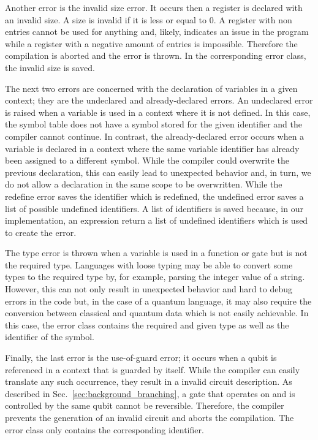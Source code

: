 Another error is the invalid size error. It occurs then a register is declared with an invalid size. A size is invalid if it is less or equal to $0$. A register with non entries cannot be used for anything and, likely, indicates an issue in the program while a register with a negative amount of entries is impossible. Therefore the compilation is aborted and the error is thrown. In the corresponding error class, the invalid size is saved.

The next two errors are concerned with the declaration of variables in a given context; they are the undeclared and already-declared errors. An undeclared error is raised when a variable is used in a context where it is not defined. In this case, the symbol table does not have a symbol stored for the given identifier and the compiler cannot continue. In contrast, the already-declared error occurs when a variable is declared in a context where the same variable identifier has already been assigned to a different symbol. While the compiler could overwrite the previous declaration, this can easily lead to unexpected behavior and, in turn, we do not allow a declaration in the same scope to be overwritten. While the redefine error saves the identifier which is redefined, the undefined error saves a list of possible undefined identifiers. A list of identifiers is saved because, in our implementation, an expression return a list of undefined identifiers which is used to create the error.

The type error is thrown when a variable is used in a function or gate but is not the required type. Languages with loose typing may be able to convert some types to the required type by, for example, parsing the integer value of a string. However, this can not only result in unexpected behavior and hard to debug errors in the code but, in the case of a quantum language, it may also require the conversion between classical and quantum data which is not easily achievable. In this case, the error class contains the required and given type as well as the identifier of the symbol.

Finally, the last error is the use-of-guard error; it occurs when a qubit is referenced in a context that is guarded by itself. While the compiler can easily translate any such occurrence, they result in a invalid circuit description. As described in Sec.~\ref{sec:background_branching}, a gate that operates on and is controlled by the same qubit cannot be reversible. Therefore, the compiler prevents the generation of an invalid circuit and aborts the compilation. The error class only contains the corresponding identifier.  

